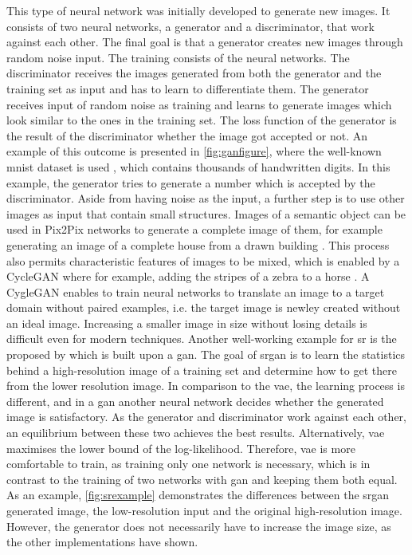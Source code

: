 \par
This type of neural network was initially developed to generate new images. It consists of two neural networks, a generator and a discriminator, that work against each other. The final goal is that a generator creates new images through random noise input. The training consists of the neural networks. The discriminator receives the images generated from both the generator and the training set as input and has to learn to differentiate them. The generator receives input of random noise as training and learns to generate images which look similar to the ones in the training set. The loss function of the generator is the result of the discriminator whether the image got accepted or not. An example of this outcome is presented in \autoref{fig:ganfigure}, where the well-known \gls{mnist} dataset is used \parencite{lecun2010}, which contains thousands of handwritten digits. In this example, the generator tries to generate a number which is accepted by the discriminator. Aside from having noise as the input, a further step is to use other images as input that contain small structures. Images of a semantic object can be used in Pix2Pix networks to generate a complete image of them, for example generating an image of a complete house from a drawn building \parencite{isola2018}. This process also permits characteristic features of images to be mixed, which is enabled by a CycleGAN where for example, adding the stripes of a zebra to a horse \parencite{zhu2020}. A CygleGAN enables to train neural networks to translate an image to a target domain without paired examples, i.e. the target image is newley created without an ideal image. Increasing a smaller image in size without losing details is difficult even for modern techniques. Another well-working example for \gls{sr} is the  proposed by \cite{Ledig2017} which is built upon a \gls{gan}. The goal of \gls{srgan} is to learn the statistics behind a high-resolution image of a training set and determine how to get there from the lower resolution image. In comparison to the \gls{vae}, the learning process is different, and in a \gls{gan} another neural network decides whether the generated image is satisfactory. As the generator and discriminator work against each other, an equilibrium between these two achieves the best results. Alternatively, \gls{vae} maximises the lower bound of the log-likelihood. Therefore, \gls{vae} is more comfortable to train, as training only one network is necessary, which is in contrast to the training of two networks with \gls{gan} and keeping them both equal. As an example, \autoref{fig:srexample} demonstrates the differences between the \gls{srgan} generated image, the low-resolution input and the original high-resolution image. However, the generator does not necessarily have to increase the image size, as the other implementations have shown.

